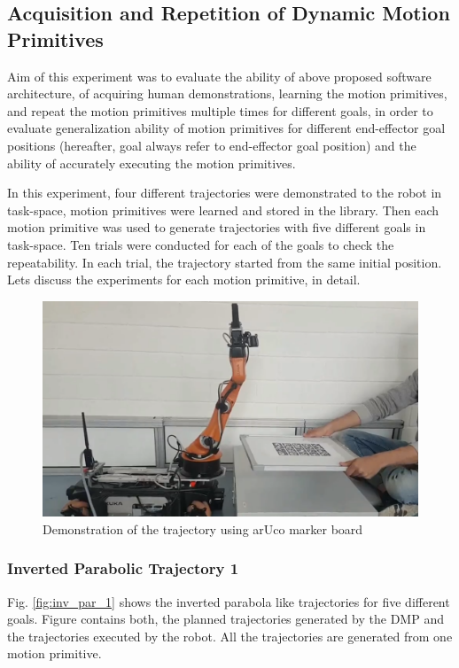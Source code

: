 \subsection{Acquisition and Repetition of Dynamic Motion Primitives}

Aim of this experiment was to evaluate the ability of above proposed software architecture, of acquiring human demonstrations, learning the motion primitives, and repeat the motion primitives multiple times for different goals, in order to evaluate generalization ability of motion primitives for different end-effector goal positions (hereafter, goal always refer to end-effector goal position) and the ability of accurately executing the motion primitives. 

In this experiment, four different trajectories were demonstrated to the robot in task-space, motion primitives were learned and stored in the library. Then each motion primitive was used to generate trajectories with five different goals in task-space. Ten trials were conducted for each of the goals to check the repeatability. In each trial, the trajectory started from the same initial position. Lets discuss the experiments for each motion primitive, in detail. 

\begin{figure}[H]
	\includegraphics[width=\textwidth]{images/demo.png}
	\caption{Demonstration of the trajectory using arUco marker board}
	\label{fig:demo}
\end{figure}

\subsubsection{Inverted Parabolic Trajectory 1}
Fig. \ref{fig:inv_par_1} shows the inverted parabola like trajectories for five different goals. Figure contains both, the planned trajectories generated by the DMP and the trajectories executed by the robot. All the trajectories are generated from one motion primitive. 

